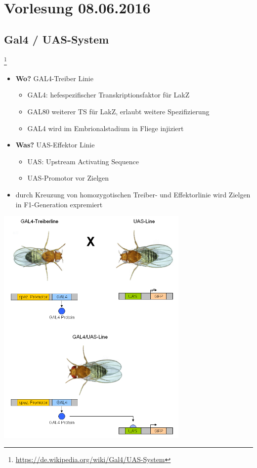 \section{Vorlesung 08.06.2016}

\subsection{Gal4 / UAS-System}\footnote{\url{https://de.wikipedia.org/wiki/Gal4/UAS-System}}
\begin{itemize}
	\item \textbf{Wo?} GAL4-Treiber Linie
		\begin{itemize}
			\item GAL4: hefespezifischer Transkriptionsfaktor für LakZ
			\item GAL80 weiterer TS für LakZ, erlaubt weitere Spezifizierung
			\item GAL4 wird im Embrionalstadium in Fliege injiziert
		\end{itemize}
	\item \textbf{Was?} UAS-Effektor Linie
		\begin{itemize}
			\item UAS: Upstream Activating Sequence
			\item UAS-Promotor vor Zielgen
		\end{itemize}
	\item durch Kreuzung von homozygotischen Treiber- und Effektorlinie wird Zielgen in F1-Generation expremiert
\end{itemize}

\begin{center}
	\includegraphics[width=0.7\textwidth]{lectures/160608/pix/Gal4UAS-System.png}
\end{center}

